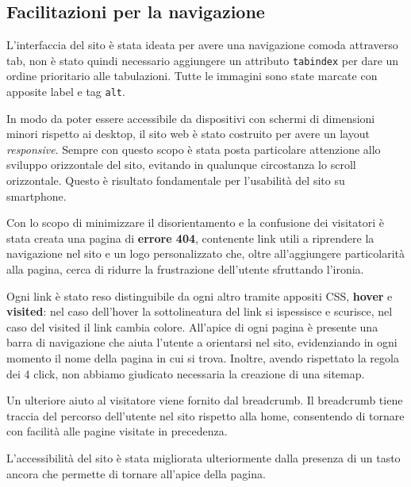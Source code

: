 	\subsection{Facilitazioni per la navigazione}
	\par L’interfaccia del sito è stata ideata per avere una navigazione comoda attraverso tab, non è stato quindi necessario aggiungere un attributo \texttt{tabindex} per dare un ordine prioritario alle tabulazioni. Tutte le immagini sono state marcate con apposite label e tag \texttt{alt}.
	\par In modo da poter essere accessibile da dispositivi con schermi di dimensioni minori rispetto ai desktop, il sito web è stato costruito per avere un layout \textit{responsive}. Sempre con questo scopo è stata posta particolare attenzione allo sviluppo orizzontale del sito, evitando in qualunque circostanza lo scroll orizzontale. Questo è risultato fondamentale per l’usabilità del sito su smartphone.
	\par Con lo scopo di minimizzare il disorientamento e la confusione dei visitatori è stata creata una pagina di \textbf{errore 404}, contenente link utili a riprendere la navigazione nel sito e un logo personalizzato che, oltre all’aggiungere particolarità alla pagina, cerca di ridurre la frustrazione dell’utente sfruttando l’ironia.
	\par Ogni link è stato reso distinguibile da ogni altro tramite appositi CSS, \textbf{hover} e \textbf{visited}: nel caso dell’hover la sottolineatura del link si ispessisce e scurisce, nel caso del visited il link cambia colore. All’apice di ogni pagina è presente una barra di navigazione che aiuta l’utente a orientarsi nel sito, evidenziando in ogni momento il nome della pagina in cui si trova. Inoltre, avendo rispettato la regola dei 4 click, non abbiamo giudicato necessaria la creazione di una sitemap.
	\par Un ulteriore aiuto al visitatore viene fornito dal breadcrumb. Il breadcrumb tiene traccia del percorso dell’utente nel sito rispetto alla home, consentendo di tornare con facilità alle pagine visitate in precedenza.
	\par L’accessibilità del sito è stata migliorata ulteriormente dalla presenza di un tasto ancora che permette di tornare all’apice della pagina.

